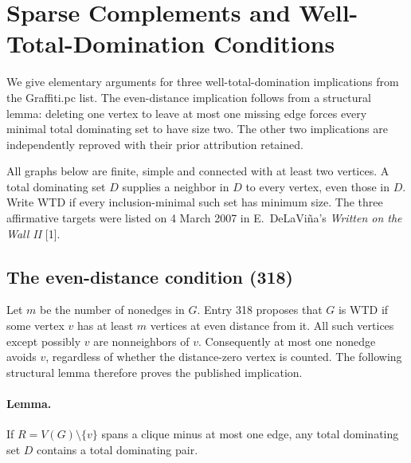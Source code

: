 \documentclass[11pt,a4paper]{article}
\numberwithin{equation}{section}
\theoremstyle{definition}
\theoremstyle{remark}
\newenvironment{sectionabstract}{\par\smallskip\begingroup\small\noindent}{\par\endgroup\medskip}
\begin{document}
\par\endgroup

\begingroup

\section{\texorpdfstring{Sparse Complements and Well-Total-Domination Conditions}{Sparse Complements and Well-Total-Domination Conditions}}\label{section:r29showa}
\par\medskip


\begin{sectionabstract}
We give elementary arguments for three well-total-domination implications from the Graffiti.pc list. The even-distance implication follows from a structural lemma: deleting one vertex to leave at most one missing edge forces every minimal total dominating set to have size two. The other two implications are independently reproved with their prior attribution retained.
\end{sectionabstract}

All graphs below are finite, simple and connected with at least two
vertices. A total dominating set $D$ supplies a neighbor in $D$ to
every vertex, even those in $D$. Write WTD if every inclusion-minimal
such set has minimum size. The three affirmative targets were listed on 4 March 2007
in E.~DeLaVi\~na's \emph{Written on the Wall II} [1].

\subsection*{The even-distance condition (318)}
Let $m$ be the number of nonedges in $G$. Entry 318 proposes that
$G$ is WTD if some vertex $v$ has at least $m$ vertices at even
distance from it. All such vertices except possibly $v$ are
nonneighbors of $v$. Consequently at most one nonedge avoids $v$,
regardless of whether the distance-zero vertex is counted. The
following structural lemma therefore proves the published implication.

\paragraph{Lemma.} If $R=V(G)\setminus\{v\}$ spans a clique minus at
most one edge, any total dominating set $D$ contains a total
dominating pair.
\end{document}
